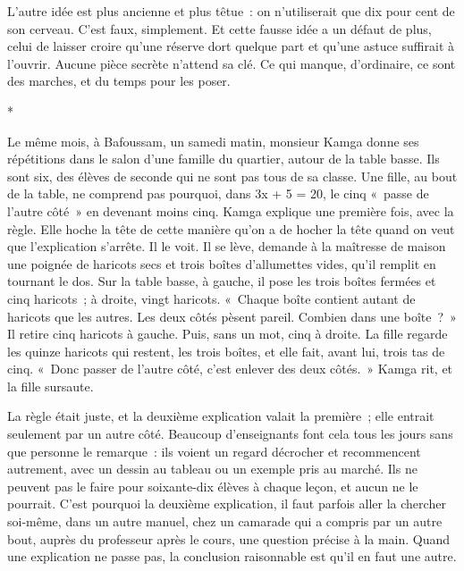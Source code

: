 \documentclass[10.5pt,twoside,openright]{book}
\newcommand{\asterisme}{\par\vspace{0.7em}\centerline{\color{gris}*\quad*\quad*}\vspace{0.7em}\par\noindent}
\begin{document}
L’autre idée est plus ancienne et plus têtue : on n’utiliserait que dix pour cent de son cerveau. C’est faux, simplement. Et cette fausse idée a un défaut de plus, celui de laisser croire qu’une réserve dort quelque part et qu’une astuce suffirait à l’ouvrir. Aucune pièce secrète n’attend sa clé. Ce qui manque, d’ordinaire, ce sont des marches, et du temps pour les poser.

\asterisme

Le même mois, à Bafoussam, un samedi matin, monsieur Kamga donne ses répétitions dans le salon d’une famille du quartier, autour de la table basse. Ils sont six, des élèves de seconde qui ne sont pas tous de sa classe. Une fille, au bout de la table, ne comprend pas pourquoi, dans 3x + 5 = 20, le cinq « passe de l’autre côté » en devenant moins cinq. Kamga explique une première fois, avec la règle. Elle hoche la tête de cette manière qu’on a de hocher la tête quand on veut que l’explication s’arrête. Il le voit. Il se lève, demande à la maîtresse de maison une poignée de haricots secs et trois boîtes d’allumettes vides, qu’il remplit en tournant le dos. Sur la table basse, à gauche, il pose les trois boîtes fermées et cinq haricots ; à droite, vingt haricots. « Chaque boîte contient autant de haricots que les autres. Les deux côtés pèsent pareil. Combien dans une boîte ? » Il retire cinq haricots à gauche. Puis, sans un mot, cinq à droite. La fille regarde les quinze haricots qui restent, les trois boîtes, et elle fait, avant lui, trois tas de cinq. « Donc passer de l’autre côté, c’est enlever des deux côtés. » Kamga rit, et la fille sursaute.

La règle était juste, et la deuxième explication valait la première ; elle entrait seulement par un autre côté. Beaucoup d’enseignants font cela tous les jours sans que personne le remarque : ils voient un regard décrocher et recommencent autrement, avec un dessin au tableau ou un exemple pris au marché. Ils ne peuvent pas le faire pour soixante-dix élèves à chaque leçon, et aucun ne le pourrait. C’est pourquoi la deuxième explication, il faut parfois aller la chercher soi-même, dans un autre manuel, chez un camarade qui a compris par un autre bout, auprès du professeur après le cours, une question précise à la main. Quand une explication ne passe pas, la conclusion raisonnable est qu’il en faut une autre.
\end{document}
